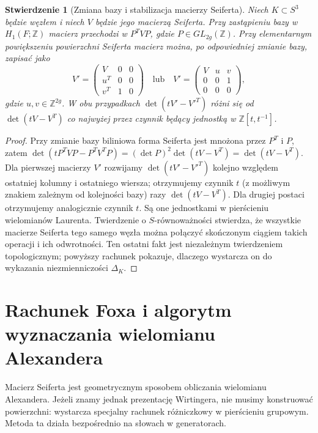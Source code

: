 \documentclass[11pt,a4paper]{report}
\numberwithin{equation}{section}
\theoremstyle{plain}
\newtheorem{stwierdzenie}[twierdzenie]{Stwierdzenie}
\theoremstyle{definition}
\theoremstyle{remark}
\begin{document}
\begin{stwierdzenie}[Zmiana bazy i stabilizacja macierzy Seiferta]
Niech $K\subset S^3$ będzie węzłem i niech $V$ będzie
jego macierzą Seiferta. Przy zastąpieniu bazy w
$H_1(F;\mathbb Z)$ macierz przechodzi w $P^TVP$,
gdzie $P\in GL_{2g}(\mathbb Z)$. Przy elementarnym
powiększeniu powierzchni Seiferta macierz można, po
odpowiedniej zmianie bazy, zapisać jako
\[
V'=\begin{pmatrix}V&0&0\\ u^T&0&0\\v^T&1&0\end{pmatrix}
\quad\text{lub}\quad
V'=\begin{pmatrix}V&u&v\\0&0&1\\0&0&0\end{pmatrix},
\]
gdzie $u,v\in\mathbb Z^{2g}$. W obu przypadkach
$\det(tV'-{V'}^T)$ różni się od $\det(tV-V^T)$
co najwyżej przez czynnik będący jednostką w
$\mathbb Z[t,t^{-1}]$.
\end{stwierdzenie}

\begin{proof}
Przy zmianie bazy biliniowa forma Seiferta jest mnożona
przez $P^T$ i $P$, zatem
$\det(tP^TVP-P^TV^TP)=(\det P)^2\det(tV-V^T)
=\det(tV-V^T)$. Dla pierwszej macierzy $V'$ rozwijamy
$\det(tV'-{V'}^T)$ kolejno względem ostatniej kolumny
i ostatniego wiersza; otrzymujemy czynnik $t$ (z
możliwym znakiem zależnym od kolejności bazy) razy
$\det(tV-V^T)$. Dla drugiej postaci otrzymujemy
analogicznie czynnik $t$. Są one jednostkami w pierścieniu
wielomianów Laurenta.
Twierdzenie o $S$-równoważności stwierdza, że wszystkie macierze
Seiferta tego samego węzła można połączyć skończonym
ciągiem takich operacji i ich odwrotności. Ten ostatni
fakt jest niezależnym twierdzeniem topologicznym; powyższy
rachunek pokazuje, dlaczego wystarcza on do wykazania
niezmienniczości $\Delta_K$.
\end{proof}

\section{Rachunek Foxa i algorytm wyznaczania wielomianu Alexandera}
\label{sec:kt-fox-calculus}

Macierz Seiferta jest geometrycznym sposobem obliczania
wielomianu Alexandera. Jeżeli znamy jednak prezentację
Wirtingera, nie musimy konstruować powierzchni: wystarcza
specjalny rachunek różniczkowy w pierścieniu grupowym.
Metoda ta działa bezpośrednio na słowach w generatorach.
\end{document}
